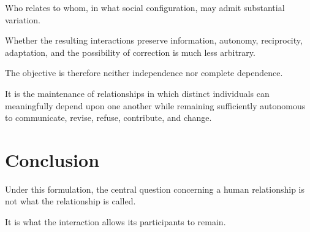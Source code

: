 \documentclass[11pt, a4paper]{article}
\begin{document}
Who relates to whom, in what social configuration, may admit substantial variation.

Whether the resulting interactions preserve information, autonomy, reciprocity, adaptation, and the possibility of correction is much less arbitrary.

The objective is therefore neither independence nor complete dependence.

It is the maintenance of relationships in which distinct individuals can meaningfully depend upon one another while remaining sufficiently autonomous to communicate, revise, refuse, contribute, and change.

\section*{Conclusion}
Under this formulation, the central question concerning a human relationship is not what the relationship is called.

It is what the interaction allows its participants to remain.
\end{document}
